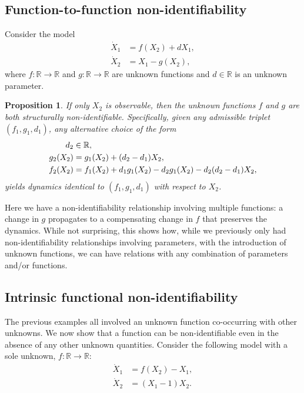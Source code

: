 \documentclass{article}
\theoremstyle{plain}
\newtheorem{proposition}{Proposition}[section]
\theoremstyle{definition}
\begin{document}
{%
\subsection{Function-to-function non-identifiability} \label{sec:nonidentifiability_types_function2function}

Consider the model
\begin{align}
    \dot{X}_1 &= f(X_2) + dX_1, \label{eq:f2f_nonident_model_dXdt} \\
    \dot{X}_2 &= X_1 - g(X_2), \label{eq:f2f_nonident_model_dYdt}
\end{align}
where $f:\mathbb{R}\to\mathbb{R}$ and $g:\mathbb{R}\to\mathbb{R}$ are unknown functions and $d\in\mathbb{R}$ is an unknown parameter.

\begin{proposition} \label{prop:f2f_nonident}
If only $X_2$ is observable, then the unknown functions $f$ and $g$ are both structurally non-identifiable. Specifically, given any admissible triplet $(f_1, g_1, d_1)$, any alternative choice of the form
\begin{align}
    \label{eq:f2f_nonident_expr}
    d_2&\in\mathbb{R},  \notag \\
    g_2(X_2) &= g_1(X_2) + (d_2 - d_1)X_2, \notag \\
    f_2(X_2) &= f_1(X_2) + d_1 g_1(X_2) - d_2 g_1(X_2) - d_2(d_2 - d_1)X_2,
\end{align}
yields dynamics identical to $(f_1, g_1, d_1)$ with respect to $X_2$.
\end{proposition}

Here we have a non-identifiability relationship involving multiple functions: a change in $g$ propagates to a compensating change in $f$ that preserves the dynamics. While not surprising, this shows how, while we previously only had non-identifiability relationships involving parameters, with the introduction of unknown functions, we can have relations with any combination of parameters and/or functions.


\subsection{Intrinsic functional non-identifiability} \label{sec:nonidentifiability_types_pure}

The previous examples all involved an unknown function co-occurring with other unknowns. We now show that a function can be non-identifiable even in the absence of any other unknown quantities. Consider the following model with a sole unknown, $f:\mathbb{R}\to\mathbb{R}$:
\begin{align}
    \dot{X}_1 &= f(X_2) - X_1,   \label{eq:fonly_nonident_model_dXdt} \\
    \dot{X}_2 &= (X_1 - 1)X_2.   \label{eq:fonly_nonident_model_dYdt}
\end{align}

}
\end{document}
